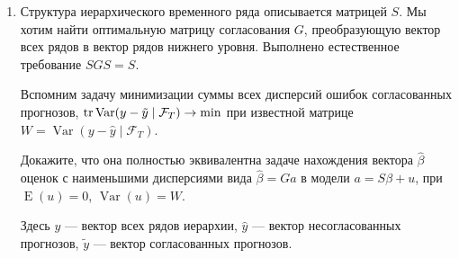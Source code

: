 \documentclass[12pt]{article}
\DeclareMathOperator{\Var}{Var}
\DeclareMathOperator{\E}{E}
\begin{document}
\begin{enumerate}
\item Структура иерархического временного ряда описывается матрицей $S$. 
Мы хотим найти оптимальную матрицу согласования $G$, преобразующую вектор всех рядов в вектор рядов нижнего уровня. 
Выполнено естественное требование $SGS=S$. 

Вспомним задачу минимизации суммы всех дисперсий ошибок согласованных прогнозов,
$\trace \Var(y - \tilde{y} \mid \mathcal{F}_T) \to \min$ 	
при известной матрице $W=\Var(y - \hat y \mid \mathcal{F}_T)$.

Докажите, что она полностью эквивалентна задаче нахождения вектора $\hat \beta$ оценок с наименьшими дисперсиями вида $\hat \beta = G a$ в модели 
$a = S \beta + u$,  при  $\E(u) = 0$, $\Var(u) = W$.

Здесь $y$ — вектор всех рядов иерархии, $\hat y$ — вектор несогласованных прогнозов, $\tilde y$ — вектор согласованных прогнозов. 

\end{enumerate}
\end{document}
